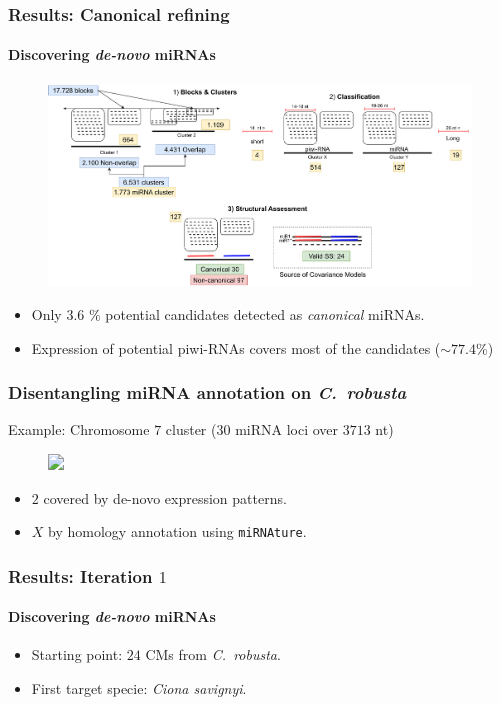 \begin{frame}[t]
    \frametitle{Results: Canonical refining}
    \framesubtitle{Discovering \textit{de-novo} miRNAs}
    \begin{figure}[h!]
        \centering
        \includegraphics[width=\linewidth]{Figures/results_workflowALL}\label{fig:workflow} %
    \end{figure}
    \begin{itemize}
        \item Only $3.6$ \% potential candidates detected as \textit{canonical} miRNAs.
        \item Expression of potential piwi-RNAs covers most of the candidates ($\sim 77.4$\%)
    \end{itemize}
\end{frame}

\begin{frame}[t]
    \frametitle{Disentangling miRNA annotation on \textit{C.\ robusta}}
    Example: Chromosome $7$ cluster ($30$ miRNA loci over $3713$ nt)
    \begin{figure}[h!]
        \centering
        \includegraphics<1>[width=\linewidth]{Figures/chr7_cluster} %
    \end{figure}
    \begin{itemize}
        \item $2$ covered by de-novo expression patterns.
        \item $X$ by homology annotation using \texttt{miRNAture}.
    \end{itemize}
\end{frame}

\begin{frame}[t]
    \frametitle{Results: Iteration $1$}
    \framesubtitle{Discovering \textit{de-novo} miRNAs}
    \begin{itemize}
        \item Starting point: $24$ CMs from \textit{C.\ robusta}.
        \item First target specie: \textit{Ciona savignyi}.
    \end{itemize}
\end{frame}

